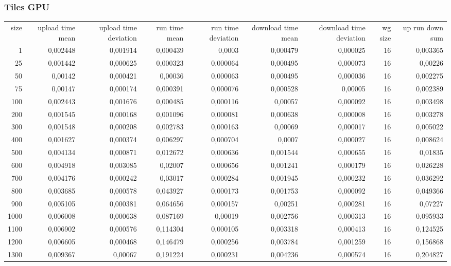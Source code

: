 \subsubsection{Tiles GPU}

\begin{tabular}{r r r r r r r r r}
size & upload time mean  & upload time deviation & run time mean & run time deviation & download time mean & download time deviation & wg size & up run down sum \\
1 & 0,002448 & 0,001914 & 0,000439 & 0,0003 & 0,000479 & 0,000025 & 16 & 0,003365 \\
25 & 0,001442 & 0,000625 & 0,000323 & 0,000064 & 0,000495 & 0,000073 & 16 & 0,00226 \\
50 & 0,00142 & 0,000421 & 0,00036 & 0,000063 & 0,000495 & 0,000036 & 16 & 0,002275 \\
75 & 0,00147 & 0,000174 & 0,000391 & 0,000076 & 0,000528 & 0,00005 & 16 & 0,002389 \\
100 & 0,002443 & 0,001676 & 0,000485 & 0,000116 & 0,00057 & 0,000092 & 16 & 0,003498 \\
200 & 0,001545 & 0,000168 & 0,001096 & 0,000081 & 0,000638 & 0,000008 & 16 & 0,003278 \\
300 & 0,001548 & 0,000208 & 0,002783 & 0,000163 & 0,00069 & 0,000017 & 16 & 0,005022 \\
400 & 0,001627 & 0,000374 & 0,006297 & 0,000704 & 0,0007 & 0,000027 & 16 & 0,008624 \\
500 & 0,004134 & 0,000871 & 0,012672 & 0,000636 & 0,001544 & 0,000655 & 16 & 0,01835 \\
600 & 0,004918 & 0,003085 & 0,02007 & 0,000656 & 0,001241 & 0,000179 & 16 & 0,026228 \\
700 & 0,004176 & 0,000242 & 0,03017 & 0,000284 & 0,001945 & 0,000232 & 16 & 0,036292 \\
800 & 0,003685 & 0,000578 & 0,043927 & 0,000173 & 0,001753 & 0,000092 & 16 & 0,049366 \\
900 & 0,005105 & 0,000381 & 0,064656 & 0,000157 & 0,00251 & 0,000281 & 16 & 0,07227 \\
1000 & 0,006008 & 0,000638 & 0,087169 & 0,00019 & 0,002756 & 0,000313 & 16 & 0,095933 \\
1100 & 0,006902 & 0,000576 & 0,114304 & 0,000105 & 0,003318 & 0,000413 & 16 & 0,124525 \\
1200 & 0,006605 & 0,000468 & 0,146479 & 0,000256 & 0,003784 & 0,001259 & 16 & 0,156868 \\
1300 & 0,009367 & 0,00067 & 0,191224 & 0,000231 & 0,004236 & 0,000574 & 16 & 0,204827 \\

\end{tabular}
